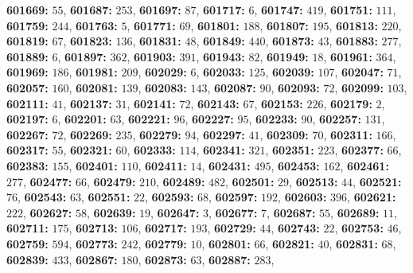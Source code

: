 \textsf{\bfseries 601669:} $55$, \textsf{\bfseries 601687:} $253$, \textsf{\bfseries 601697:} $87$, \textsf{\bfseries 601717:} $6$, \textsf{\bfseries 601747:} $419$, \textsf{\bfseries 601751:} $111$, \textsf{\bfseries 601759:} $244$, \textsf{\bfseries 601763:} $5$, \textsf{\bfseries 601771:} $69$, \textsf{\bfseries 601801:} $188$, \textsf{\bfseries 601807:} $195$, \textsf{\bfseries 601813:} $220$, \textsf{\bfseries 601819:} $67$, \textsf{\bfseries 601823:} $136$, \textsf{\bfseries 601831:} $48$, \textsf{\bfseries 601849:} $440$, \textsf{\bfseries 601873:} $43$, \textsf{\bfseries 601883:} $277$, \textsf{\bfseries 601889:} $6$, \textsf{\bfseries 601897:} $362$, \textsf{\bfseries 601903:} $391$, \textsf{\bfseries 601943:} $82$, \textsf{\bfseries 601949:} $18$, \textsf{\bfseries 601961:} $364$, \textsf{\bfseries 601969:} $186$, \textsf{\bfseries 601981:} $209$, \textsf{\bfseries 602029:} $6$, \textsf{\bfseries 602033:} $125$, \textsf{\bfseries 602039:} $107$, \textsf{\bfseries 602047:} $71$, \textsf{\bfseries 602057:} $160$, \textsf{\bfseries 602081:} $139$, \textsf{\bfseries 602083:} $143$, \textsf{\bfseries 602087:} $90$, \textsf{\bfseries 602093:} $72$, \textsf{\bfseries 602099:} $103$, \textsf{\bfseries 602111:} $41$, \textsf{\bfseries 602137:} $31$, \textsf{\bfseries 602141:} $72$, \textsf{\bfseries 602143:} $67$, \textsf{\bfseries 602153:} $226$, \textsf{\bfseries 602179:} $2$, \textsf{\bfseries 602197:} $6$, \textsf{\bfseries 602201:} $63$, \textsf{\bfseries 602221:} $96$, \textsf{\bfseries 602227:} $95$, \textsf{\bfseries 602233:} $90$, \textsf{\bfseries 602257:} $131$, \textsf{\bfseries 602267:} $72$, \textsf{\bfseries 602269:} $235$, \textsf{\bfseries 602279:} $94$, \textsf{\bfseries 602297:} $41$, \textsf{\bfseries 602309:} $70$, \textsf{\bfseries 602311:} $166$, \textsf{\bfseries 602317:} $55$, \textsf{\bfseries 602321:} $60$, \textsf{\bfseries 602333:} $114$, \textsf{\bfseries 602341:} $321$, \textsf{\bfseries 602351:} $223$, \textsf{\bfseries 602377:} $66$, \textsf{\bfseries 602383:} $155$, \textsf{\bfseries 602401:} $110$, \textsf{\bfseries 602411:} $14$, \textsf{\bfseries 602431:} $495$, \textsf{\bfseries 602453:} $162$, \textsf{\bfseries 602461:} $277$, \textsf{\bfseries 602477:} $66$, \textsf{\bfseries 602479:} $210$, \textsf{\bfseries 602489:} $482$, \textsf{\bfseries 602501:} $29$, \textsf{\bfseries 602513:} $44$, \textsf{\bfseries 602521:} $76$, \textsf{\bfseries 602543:} $63$, \textsf{\bfseries 602551:} $22$, \textsf{\bfseries 602593:} $68$, \textsf{\bfseries 602597:} $192$, \textsf{\bfseries 602603:} $396$, \textsf{\bfseries 602621:} $222$, \textsf{\bfseries 602627:} $58$, \textsf{\bfseries 602639:} $19$, \textsf{\bfseries 602647:} $3$, \textsf{\bfseries 602677:} $7$, \textsf{\bfseries 602687:} $55$, \textsf{\bfseries 602689:} $11$, \textsf{\bfseries 602711:} $175$, \textsf{\bfseries 602713:} $106$, \textsf{\bfseries 602717:} $193$, \textsf{\bfseries 602729:} $44$, \textsf{\bfseries 602743:} $22$, \textsf{\bfseries 602753:} $46$, \textsf{\bfseries 602759:} $594$, \textsf{\bfseries 602773:} $242$, \textsf{\bfseries 602779:} $10$, \textsf{\bfseries 602801:} $66$, \textsf{\bfseries 602821:} $40$, \textsf{\bfseries 602831:} $68$, \textsf{\bfseries 602839:} $433$, \textsf{\bfseries 602867:} $180$, \textsf{\bfseries 602873:} $63$, \textsf{\bfseries 602887:} $283$, 
